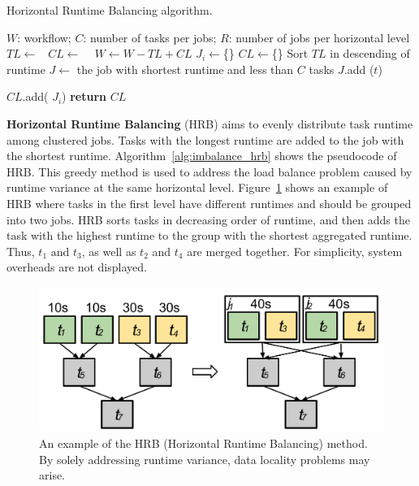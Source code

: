 \begin{algorithm}[!htb]
	\footnotesize
	\caption{Horizontal Runtime Balancing algorithm.}
	\label{alg:imbalance_hrb}
	\begin{algorithmic}[1]
		\Require $W$: workflow; $C$: number of tasks per jobs; $R$: number of jobs per horizontal level
				\State $TL\gets $\  
				\State $CL\gets$  \  
				\State $W \gets W - TL + CL$   
			\EndFor
		\EndProcedure
			\State $J_i\gets$\{\}
			\EndFor
			\State $CL\gets$\{\}
			\State Sort $TL$ in descending of runtime
				\State $J\gets$ the job with shortest runtime and less than $C$ tasks  
				\State $J$.add ($t$) 
				
			\EndFor
			\State  $CL$.add( $J_i$)
			\EndFor
			\State \textbf{return} $CL$
		\EndProcedure
	\end{algorithmic}
\end{algorithm}



\textbf{Horizontal Runtime Balancing} (HRB) aims to evenly distribute task runtime among clustered jobs. Tasks with the longest runtime are added to the job with the shortest runtime. Algorithm~\ref{alg:imbalance_hrb} shows the pseudocode of HRB. This greedy method is used to address the load balance problem caused by runtime variance at the same horizontal level. Figure~\ref{fig:imbalance_hrb} shows an example of HRB where tasks in the first level have different runtimes and should be grouped into two jobs. HRB sorts tasks in decreasing order of runtime, and then adds the task with the highest runtime to the group with the shortest aggregated runtime. Thus, $t_1$ and $t_3$, as well as $t_2$ and $t_4$ are merged together.
For simplicity, system overheads are not displayed.

\begin{figure}[htb]
	\centering
	\includegraphics[width=0.7\linewidth]{figures/balance/figure8.pdf}
	\caption{An example of the HRB (Horizontal Runtime Balancing) method. By solely addressing runtime variance, data locality problems may arise.}
	\label{fig:imbalance_hrb}
\end{figure}


